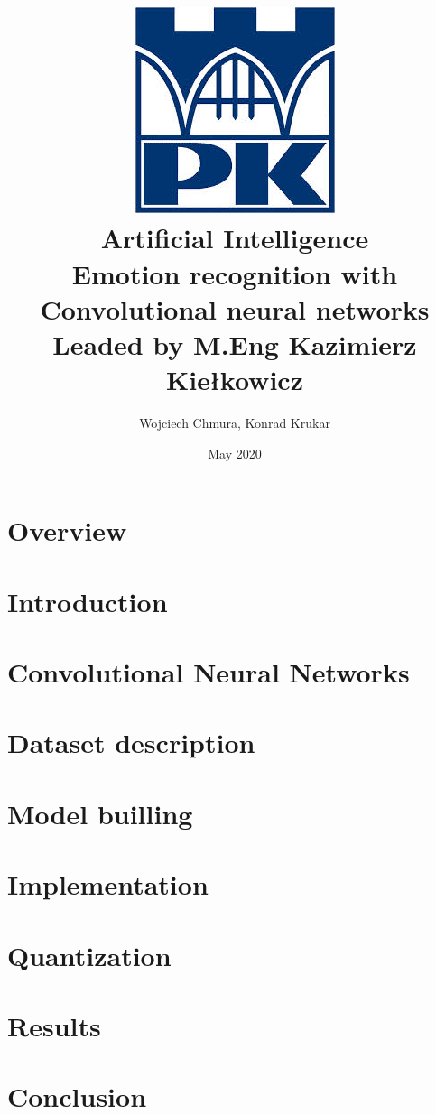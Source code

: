 \documentclass{article}
\title{
    {\includegraphics{./images/logo_pk.jpg}}\\
    {Artificial Intelligence}\\
    {\large Emotion recognition with Convolutional neural networks}\\
     \small Leaded by M.Eng Kazimierz Kiełkowicz
    }
\author{Wojciech Chmura, Konrad Krukar}
\date{May 2020}
\begin{document}
    \maketitle
    \newpage
    \tableofcontents
    \newpage
    
    \section{Overview}
    
    
    \section{Introduction}
    
    \section{Convolutional Neural Networks}
    
    \section{Dataset description}
    
    
    \section{Model builling}
    

    
    \section{Implementation}
    
    \section{Quantization}
    
    \section{Results}
    
    \section{Conclusion}
\end{document}
